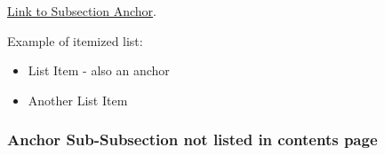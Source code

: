 \documentclass[a4paper,12pt]{article}
\begin{document}
  \hyperlink{LinkToSubsection}{Link to Subsection Anchor}.
  
  Example of itemized list:
  \begin{itemize}
          \label{sec:Step2}
          \item
            List Item - also an anchor
          \item
            Another List Item
  \end{itemize}	
	

\hypertarget{LinkToSubsection}{
	\subsubsection*{Anchor Sub-Subsection not listed in contents page}
}
\end{document}
